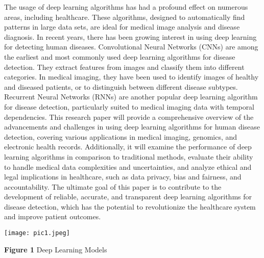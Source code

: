 \documentclass[journal]{IEEEtran}
\begin{document}
The usage of deep learning algorithms has had a profound effect on numerous areas, including healthcare. These algorithms, designed to automatically find patterns in large data sets, are ideal for medical image analysis and disease diagnosis. In recent years, there has been growing interest in using deep learning for detecting human diseases. Convolutional Neural Networks (CNNs) are among the earliest and most commonly used deep learning algorithms for disease detection. They extract features from images and classify them into different categories. In medical imaging, they have been used to identify images of healthy and diseased patients, or to distinguish between different disease subtypes. Recurrent Neural Networks (RNNs) are another popular deep learning algorithm for disease detection, particularly suited to medical imaging data with temporal dependencies. This research paper will provide a comprehensive overview of the advancements and challenges in using deep learning algorithms for human disease detection, covering various applications in medical imaging, genomics, and electronic health records. Additionally, it will examine the performance of deep learning algorithms in comparison to traditional methods, evaluate their ability to handle medical data complexities and uncertainties, and analyze ethical and legal implications in healthcare, such as data privacy, bias and fairness, and accountability. The ultimate goal of this paper is to contribute to the development of reliable, accurate, and transparent deep learning algorithms for disease detection, which has the potential to revolutionize the healthcare system and improve patient outcomes.
\begin{center}
\texttt{[image: pic1.jpeg]}
    \item{\footnotesize{\textbf {Figure 1} Deep Learning Models}}
\end{center}
\end{document}

